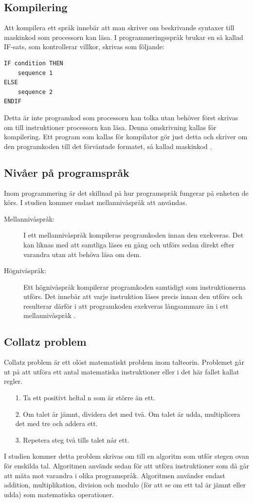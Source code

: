 \documentclass[12pt,swedish]{article}
\begin{document}
\subsection{Kompilering}
Att kompilera ett språk innebär att man skriver om beskrivande syntaxer till maskinkod som processorn kan läsa. I programmeringsspråk brukar en så kallad IF-sats, som kontrollerar villkor, skrivas som följande:
\begin{lstlisting}
IF condition THEN
    sequence 1
ELSE
    sequence 2
ENDIF
\end{lstlisting}
Detta är inte programkod som processorn kan tolka utan behöver först skrivas om till instruktioner processorn kan läsa. Denna omskrivning kallas för kompilering. Ett program som kallas för kompilator gör just detta och skriver om den programkoden till det förväntade formatet, så kallad maskinkod \citep{srikant_shankar_2008}.

\subsection{Nivåer på programspråk}
Inom programmering är det skillnad på hur programspråk fungerar på enheten de körs. I studien kommer endast mellannivåspråk att användas.
\begin{description}
    \item [Mellannivåspråk:] I ett mellannivåspråk kompileras programkoden innan den exekveras. Det kan liknas med att samtliga läses en gång och utförs sedan direkt efter varandra utan att behöva läsa om dem.
    \item [Högnivåspråk:] Ett högnivåspråk kompilerar programkoden samtidigt som instruktionerna utförs. Det innebär att varje instruktion läses precis innan den utförs och resulterar därför i att programkoden exekveras långsammare än i ett mellannivåspråk \citep{maclachlan_1992}.
\end{description}


\subsection{Collatz problem}
Collatz problem är ett olöst matematiskt problem inom talteorin. Problemet går ut på att utföra ett antal matematiska instruktioner eller i det här fallet kallat regler.
\begin{enumerate}
    \item [1.] Ta ett positivt heltal n som är större än ett.
    \item [2.] Om talet är jämnt, dividera det med två. Om talet är udda, multiplicera det med tre och addera ett.
    \item [3.] Repetera steg två tills talet når ett.
\end{enumerate}
I studien kommer detta problem skrivas om till en algoritm som utför stegen ovan för enskilda tal. Algoritmen används sedan för att utföra instruktioner som då går att mäta mot varandra i olika programspråk. Algoritmen använder endast addition, multiplikation, division och modulo (för att se om ett tal är jämnt eller udda) som matematiska operationer.
\end{document}
